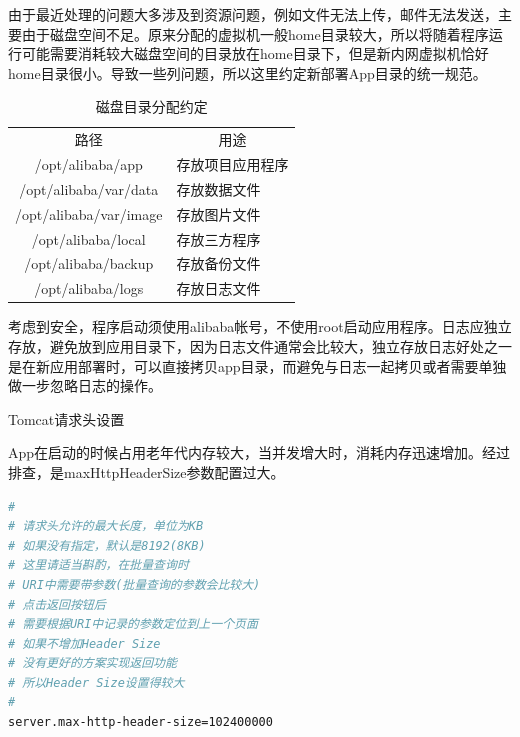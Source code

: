 \documentclass[8pt]{book}
\makeatletter
\numberwithin{dummy}{section}
\theoremstyle{ocrenumbox}
\theoremstyle{blacknumex}
\theoremstyle{blacknumbox}
\theoremstyle{ocrenum}
\renewcommand{\subsection}{\@startsection {subsection}{2}{\z@}
	{-3ex \@plus -0.1ex \@minus -.4ex}
	{0.5ex \@plus.2ex }
	{\normalfont\sffamily\bfseries}}
\makeatother
\begin{document}
由于最近处理的问题大多涉及到资源问题，例如文件无法上传，邮件无法发送，主要由于磁盘空间不足。原来分配的虚拟机一般home目录较大，所以将随着程序运行可能需要消耗较大磁盘空间的目录放在home目录下，但是新内网虚拟机恰好home目录很小。导致一些列问题，所以这里约定新部署App目录的统一规范。

\begin{table}[htbp]
	\caption{磁盘目录分配约定}
	\label{table:}
	\begin{center}
		\begin{tabular}{|c|p{5cm}|}
			\hline
			\multirow{1}{*}{路径}
			& \multicolumn{1}{c|}{用途}\\			
			\cline{1-2}
			/opt/alibaba/app &  存放项目应用程序  \\
			\hline
			/opt/alibaba/var/data & 存放数据文件 \\
			\hline			
			/opt/alibaba/var/image & 存放图片文件 \\
			\hline
			/opt/alibaba/local & 存放三方程序 \\
			\hline
			/opt/alibaba/backup & 存放备份文件 \\
			\hline
			/opt/alibaba/logs & 存放日志文件 \\
			\hline														
		\end{tabular}	
	\end{center}
\end{table}

考虑到安全，程序启动须使用alibaba帐号，不使用root启动应用程序。日志应独立存放，避免放到应用目录下，因为日志文件通常会比较大，独立存放日志好处之一是在新应用部署时，可以直接拷贝app目录，而避免与日志一起拷贝或者需要单独做一步忽略日志的操作。




\subsection{Tomcat请求头设置}

App在启动的时候占用老年代内存较大，当并发增大时，消耗内存迅速增加。经过排查，是maxHttpHeaderSize参数配置过大。

\begin{lstlisting}[language=Bash]
#
# 请求头允许的最大长度，单位为KB
# 如果没有指定，默认是8192(8KB)
# 这里请适当斟酌，在批量查询时
# URI中需要带参数(批量查询的参数会比较大)
# 点击返回按钮后
# 需要根据URI中记录的参数定位到上一个页面
# 如果不增加Header Size
# 没有更好的方案实现返回功能
# 所以Header Size设置得较大
#
server.max-http-header-size=102400000
\end{lstlisting}
\end{document}
